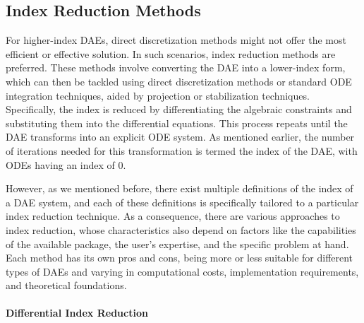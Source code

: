\subsection{Index Reduction Methods}

For higher-index \acp{DAE}, direct discretization methods might not offer the most efficient or effective solution. In such scenarios, index reduction methods are preferred. These methods involve converting the \ac{DAE} into a lower-index form, which can then be tackled using direct discretization methods or standard \ac{ODE} integration techniques, aided by projection or stabilization techniques. Specifically, the index is reduced by differentiating the algebraic constraints and substituting them into the differential equations. This process repeats until the \ac{DAE} transforms into an explicit \ac{ODE} system. As mentioned earlier, the number of iterations needed for this transformation is termed the index of the \ac{DAE}, with \acp{ODE} having an index of 0.

However, as we mentioned before, there exist multiple definitions of the index of a \ac{DAE} system, and each of these definitions is specifically tailored to a particular index reduction technique. As a consequence, there are various approaches to index reduction, whose characteristics also depend on factors like the capabilities of the available package, the user's expertise, and the specific problem at hand. Each method has its own pros and cons, being more or less suitable for different types of \acp{DAE} and varying in computational costs, implementation requirements, and theoretical foundations.



\paragraph{Differential Index Reduction}

